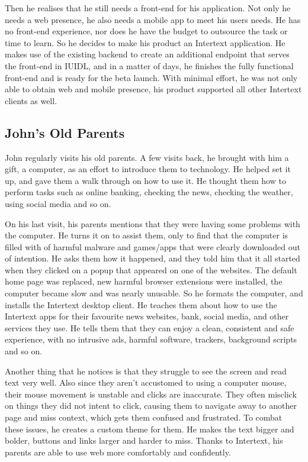 Then he realises that he still needs a front-end for his application. Not only he needs a web presence, he also needs a mobile app to meet his users needs. He has no front-end experience, nor does he have the budget to outsource the task or time to learn. So he decides to make his product an Intertext application. He makes use of the existing backend to create an additional endpoint that serves the front-end in IUIDL, and in a matter of days, he finishes the fully functional front-end and is ready for the beta launch. With minimal effort, he was not only able to obtain web and mobile presence, his product supported all other Intertext clients as well.

\subsection{John's Old Parents}

John regularly visits his old parents. A few visits back, he brought with him a gift, a computer, as an effort to introduce them to technology. He helped set it up, and gave them a walk through on how to use it. He thought them how to perform tasks such as online banking, checking the news, checking the weather, using social media and so on. 

On his last visit, his parents mentions that they were having some problems with the computer. He turns it on to assist them, only to find that the computer is filled with of harmful malware and games/apps that were clearly downloaded out of intention. He asks them how it happened, and they told him that it all started when they clicked  on a popup that appeared on one of the websites. The default home page was replaced, new harmful browser extensions were installed, the computer became slow and was nearly unusable. So he formats the computer, and installs the Intertext desktop client. He teaches them about how to use the Intertext apps for their favourite news websites, bank, social media, and other services they use. He tells them that they can enjoy a clean, consistent and safe experience, with no intrusive ads, harmful software, trackers, background scripts and so on. 

Another thing that he notices is that they struggle to see the screen and read text very well. Also since they aren't accustomed to using a computer mouse, their mouse movement is unstable and clicks are inaccurate. They often misclick on things they did not intent to click, causing them to navigate away to another page and miss context, which gets them confused and frustrated. To combat these issues, he creates a custom theme for them. He makes the text bigger and bolder, buttons and links larger and harder to miss. Thanks to Intertext, his parents are able to use web more comfortably and confidently.

